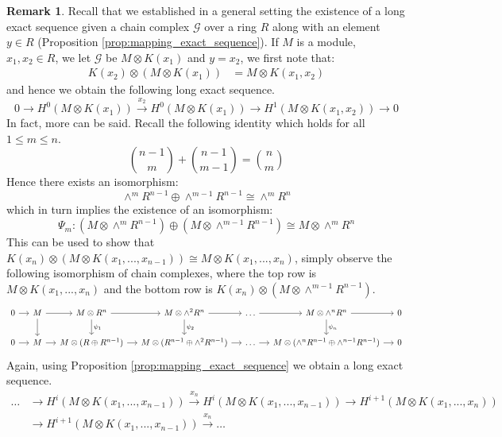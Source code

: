 \documentclass[12pt]{article}
\theoremstyle{plain}
\theoremstyle{definition}
\newtheorem{remark}[thm]{Remark}
\newcommand{\scr}[1]{\mathscr{#1}}
\newcommand{\lto}{\longrightarrow}
\begin{document}
\begin{remark}\label{rmk:long_exact_sequence}
	Recall that we established in a general setting the existence of a long exact sequence given a chain complex $\scr{G}$ over a ring $R$ along with an element $y \in R$ (Proposition \ref{prop:mapping_exact_sequence}). If $M$ is a module, $x_1,x_2 \in R$, we let $\scr{G}$ be $M \otimes K(x_1)$ and $y = x_2$, we first note that:
	\begin{align*}
		K(x_2) \otimes (M \otimes K(x_1)) &= M \otimes K(x_1,x_2)
	\end{align*}
	and hence we obtain the following long exact sequence.
	\begin{equation}
		0 \lto H^0(M \otimes K(x_1)) \stackrel{x_2}{\lto} H^0(M \otimes K(x_1)) \lto H^1(M \otimes K(x_1,x_2)) \lto 0
	\end{equation}
	In fact, more can be said. Recall the following identity which holds for all $1 \leq m \leq n$.
	\begin{equation}
		{n-1 \choose m} + {n-1 \choose m-1} = {n \choose m}
	\end{equation}
	Hence there exists an isomorphism:
	\begin{equation}
		\wedge^{m}R^{n-1} \oplus \wedge^{m-1}R^{n-1} \cong \wedge^m R^n
	\end{equation}
	which in turn implies the existence of an isomorphism:
	\begin{equation}
		\Psi_m: (M \otimes \wedge^{m}R^{n-1}) \oplus (M \otimes \wedge^{m-1}R^{n-1}) \cong M \otimes \wedge^mR^n
	\end{equation}
	This can be used to show that $K(x_n) \otimes (M \otimes K(x_1,...,x_{n-1})) \cong M \otimes K(x_1,...,x_n)$, simply observe the following isomorphism of chain complexes, where the top row is $M \otimes K(x_1,...,x_n)$ and the bottom row is $K(x_n) \otimes (M \otimes \wedge^{m-1}R^{n-1})$.
	\begin{equation}
		\begin{tikzcd}[column sep = small]
			0\arrow[r] & M\arrow[r]\arrow[d] & M \otimes R^{n}\arrow[r]\arrow[d,"{\psi_1}"] & M \otimes \wedge^2 R^n\arrow[r]\arrow[d,"{\psi_2}"] & \hdots\arrow[r] & M \otimes \wedge^n R^n\arrow[r]\arrow[d,"{\psi_n}"] & 0\\
			0\arrow[r] & M\arrow[r] & M\otimes(R \oplus R^{n-1} )\arrow[r] & M \otimes ( R^{n-1} \oplus \wedge^2 R^{n-1})\arrow[r] & \hdots\arrow[r] & M \otimes (\wedge^{n}R^{n-1} \oplus \wedge^{n-1}R^{n-1})\arrow[r] & 0
		\end{tikzcd}
	\end{equation}
	Again, using Proposition \ref{prop:mapping_exact_sequence} we obtain a long exact sequence.
	\begin{align*}
		\hdots &\lto H^i(M \otimes K(x_1,...,x_{n-1})) \stackrel{x_n}{\lto} H^i(M \otimes K(x_1,...,x_{n-1})) \lto H^{i+1}(M \otimes K(x_1,...,x_n))\\
		&\lto H^{i+1}(M \otimes K(x_1,...,x_{n-1})) \stackrel{x_n}{\lto} \hdots
	\end{align*}
\end{remark}
\end{document}
